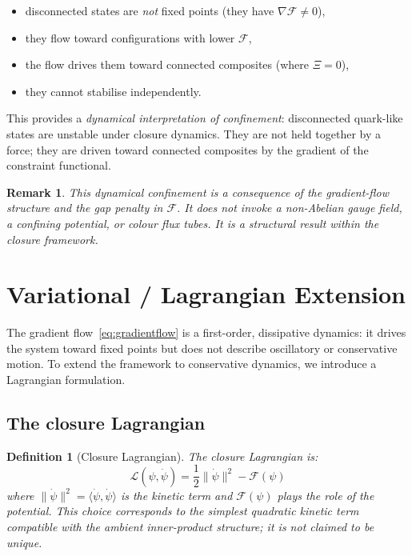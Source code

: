 \documentclass[12pt]{article}
\newtheorem{definition}[theorem]{Definition}
\newtheorem{remark}[theorem]{Remark}
\newcommand{\Fcal}{\mathcal{F}}
\newcommand{\Lcal}{\mathcal{L}}
\begin{document}
\begin{itemize}
    \item disconnected states are \textit{not} fixed points (they have $\nabla\Fcal \neq 0$),
    \item they flow toward configurations with lower $\Fcal$,
    \item the flow drives them toward connected composites (where $\Xi = 0$),
    \item they cannot stabilise independently.
\end{itemize}

This provides a \textit{dynamical interpretation of confinement}: disconnected quark-like states are unstable under closure dynamics. They are not held together by a force; they are driven toward connected composites by the gradient of the constraint functional.

\begin{remark}
This dynamical confinement is a consequence of the gradient-flow structure and the gap penalty in $\Fcal$. It does not invoke a non-Abelian gauge field, a confining potential, or colour flux tubes. It is a structural result within the closure framework.
\end{remark}

\section{Variational / Lagrangian Extension}\label{sec:lagrangian}

The gradient flow~\eqref{eq:gradientflow} is a first-order, dissipative dynamics: it drives the system toward fixed points but does not describe oscillatory or conservative motion. To extend the framework to conservative dynamics, we introduce a Lagrangian formulation.

\subsection{The closure Lagrangian}

\begin{definition}[Closure Lagrangian]\label{def:lagrangian}
The closure Lagrangian is:
\begin{equation}\label{eq:lagrangian}
    \Lcal(\psi, \dot{\psi}) = \frac{1}{2}\|\dot{\psi}\|^2 - \Fcal(\psi)
\end{equation}
where $\|\dot{\psi}\|^2 = \langle\dot{\psi}, \dot{\psi}\rangle$ is the kinetic term and $\Fcal(\psi)$ plays the role of the potential. This choice corresponds to the simplest quadratic kinetic term compatible with the ambient inner-product structure; it is not claimed to be unique.
\end{definition}
\end{document}
